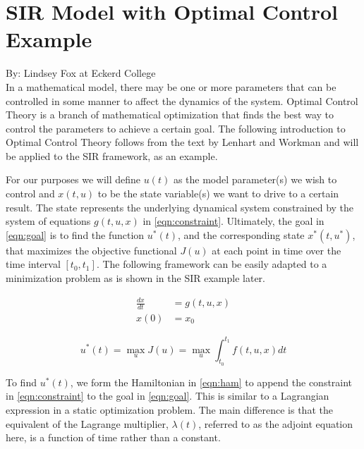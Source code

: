 \documentclass[12pt]{article}
\begin{document}
	
\section*{SIR Model with Optimal Control Example}

By: Lindsey Fox at Eckerd College \\

In a mathematical model, there may be one or more parameters that can be controlled in some manner to affect the dynamics of the system. Optimal Control Theory is a branch of mathematical optimization that finds the best way to control the parameters to achieve a certain goal. The following introduction to Optimal Control Theory follows from the text by Lenhart and Workman \cite{OCBook} and will be applied to the SIR framework, as an example.

For our purposes we will define $u(t)$ as the model parameter(s) we wish to control and $x(t, u)$ to be the state variable(s) we want to drive to a certain result. The state represents the underlying dynamical system constrained by the system of equations $g(t, u, x)$ in \eqref{eqn:constraint}. Ultimately, the goal in \eqref{eqn:goal} is to find the function $u^*(t)$, and the corresponding state $x^*(t, u^*)$, that maximizes the objective functional $J(u)$ at each point in time over the time interval $[t_0, t_1]$. The following framework can be easily adapted to a minimization problem as is shown in the SIR example later.

\begin{equation} \label{eqn:constraint}
	\begin{aligned}
		\frac{dx}{dt} &= g(t, u, x) \\[5pt] 
		x(0) &= x_0
	\end{aligned}
\end{equation}

\begin{equation} \label{eqn:goal}
	u^*(t) = \max\limits_{u} J(u) = \max\limits_{u} \int_{t_0}^{t_1} f(t, u, x) dt
\end{equation}

To find $u^*(t)$, we form the Hamiltonian in \eqref{eqn:ham} to append the constraint in \eqref{eqn:constraint} to the goal in \eqref{eqn:goal}. This is similar to a Lagrangian expression in a static optimization problem. The main difference is that the equivalent of the Lagrange multiplier, $\lambda(t)$, referred to as the adjoint equation here, is a function of time rather than a constant.
\end{document}
